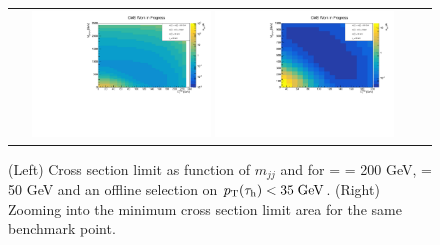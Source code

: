 \begin{figure}[tbh!]
	\centering
	\begin{tabular}{cc}
		\includegraphics[width=0.45\textwidth]{analysis/pics/JetInvMass_vs_MET_xsec_chi200_lsp050_taupt35.pdf}
		\includegraphics[width=0.45\textwidth]{analysis/pics/JetInvMass_vs_MET_xsec_chi200_lsp050_taupt35_zoom.pdf} 		
	\end{tabular}
	\caption{(Left) Cross section limit as function of $m_{jj}$ and \met for \charginopm = \neutralinotwo = 200 GeV, \neutralinoone = 50 GeV and an offline selection on $p_{\text{T}}(\tau_{\text{h}}) <  35\;\text{Ge}\kern-0.06667em\text{V}$. (Right) Zooming into the minimum cross section limit area for the same benchmark point.}
	\label{fig::JetInvMass_vs_MET_xsec_chi200_lsp050_taupt35}
\end{figure}

